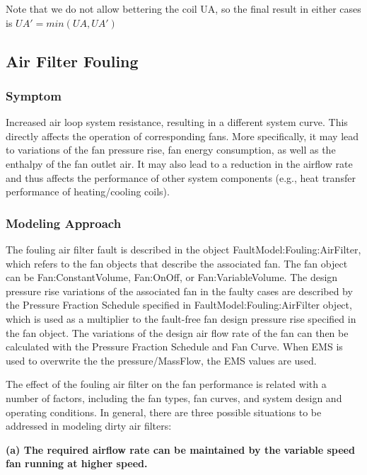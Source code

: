 Note that we do not allow bettering the coil UA, so the final result in either cases is $UA' = min(UA, UA')$


\subsection{Air Filter Fouling}\label{air-filter-fouling}

\subsubsection{Symptom}\label{symptom-3}

Increased air loop system resistance, resulting in a different system curve. This directly affects the operation of corresponding fans. More specifically, it may lead to variations of the fan pressure rise, fan energy consumption, as well as the enthalpy of the fan outlet air. It may also lead to a reduction in the airflow rate and thus affects the performance of other system components (e.g., heat transfer performance of heating/cooling coils).

\subsubsection{Modeling Approach}\label{modeling-approach-3}

The fouling air filter fault is described in the object FaultModel:Fouling:AirFilter, which refers to the fan objects that describe the associated fan. The fan object can be Fan:ConstantVolume, Fan:OnOff, or Fan:VariableVolume. The design pressure rise variations of the associated fan in the faulty cases are described by the Pressure Fraction Schedule specified in FaultModel:Fouling:AirFilter object, which is used as a multiplier to the fault-free fan design pressure rise specified in the fan object. The variations of the design air flow rate of the fan can then be calculated with the Pressure Fraction Schedule and Fan Curve. When EMS is used to overwrite the the pressure/MassFlow, the EMS values are used.

The effect of the fouling air filter on the fan performance is related with a number of factors, including the fan types, fan curves, and system design and operating conditions. In general, there are three possible situations to be addressed in modeling dirty air filters:

\textbf{(a) The required airflow rate can be maintained by the variable speed fan running at higher speed.}

